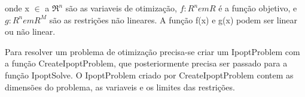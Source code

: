 onde x $\in$ a $\Re ^ n$ são as variaveis de otimização, $f : R^n em R$ é a função objetivo, e $g: R^n em R^M$ são as restrições não lineares. A função f(x) e g(x) podem ser linear ou não linear.  

Para resolver um problema de otimização precisa-se criar um IpoptProblem com a função CreateIpoptProblem, que posteriormente precisa ser passado para a função IpoptSolve. O IpoptProblem criado por CreateIpoptProblem contem as dimensões do problema, as variaveis e os limites das restrições.







